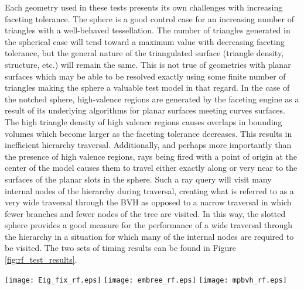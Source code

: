 Each geometry used in these tests presents its own challenges with increasing
faceting tolerance. The sphere is a good control case for an increasing number
of triangles with a well-behaved tessellation. The number of triangles generated
in the spherical case will tend toward a maximum value with decreasing faceting
tolerance, but the general nature of the triangulated surface (triangle density,
structure, etc.)  will remain the same. This is not true of geometries with
planar surfaces which may be able to be resolved exactly using some finite
number of triangles making the sphere a valuable test model in that regard. In
the case of the notched sphere, high-valence regions are generated by the
faceting engine as a result of its underlying algorithms for planar surfaces
meeting curves surfaces. The high triangle density of high valence regions
causes overlaps in bounding volumes which become larger as the faceting
tolerance decreases. This results in inefficient hierarchy
traversal. Additionally, and perhaps more importantly than the presence of high
valence regions, rays being fired with a point of origin at the center of the
model causes them to travel either exactly along or very near to the surfaces of
the planar slots in the sphere. Such a ray query will visit many internal nodes
of the hierarchy during traversal, creating what is referred to as a very wide
traversal through the BVH as opposed to a narrow traversal in which fewer
branches and fewer nodes of the tree are visited. In this way, the slotted
sphere provides a good measure for the performance of a wide traversal through
the hierarchy in a situation for which many of the internal nodes are required
to be visited. The two sets of timing results can be found in Figure
\ref{fig:rf_test_results}.

\begin{sidewaysfigure}[]
  \centering
  \texttt{[image: Eig\_fix\_rf.eps]}
  \texttt{[image: embree\_rf.eps]}
  \texttt{[image: mpbvh\_rf.eps]}
  \caption[Ray fire test results all DAGMC implementations.]{Ray fire test
    results on three representative DAGMC volumes shown in Figure
    \ref{models}. Each data point represents the average ray fire time for 600k
    randomly directed rays from the origin of each volume. Top Left: Results of
    the tests for MOAB's OBB Tree. Top Right: Results of the tests for DAGMC
    coupled with Embree, or EmDAG. Bottom: Ray fire test results for DAGMC
    coupled with the MPBVH. The scale used for the MOAB OBB Tree is 10x greater
    than in the other two cases due its lower performance.}
  \label{fig:rf_test_results}
\end{sidewaysfigure}

